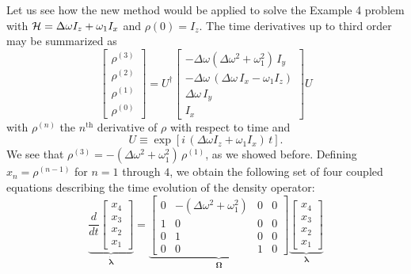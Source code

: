 Let us see how the new method would be applied to solve the Example 4 problem with ${\cal H} = \Delta \omega I_z + \omega_1 I_x$ and $\rho(0) = I_z$.  The time derivatives up to third order may be summarized as
\begin{equation}
\begin{bmatrix}
	\rho^{(3)} \\
	\rho^{(2)} \\
	\rho^{(1)} \\
	\rho^{(0)} 
\end{bmatrix}
=
U^{\dagger}
\begin{bmatrix}
	- \Delta\omega (\Delta\omega^2 + \omega_1^2) \, I_y \\
	-\Delta\omega \, (\Delta\omega \, I_x - \omega_1 I_z)  \\
	\Delta \omega \, I_y \\
	I_x 
\end{bmatrix}
U
\end{equation}
with $\rho^{(n)}$ the $n^{\text{th}}$ derivative of $\rho$ with respect to time and
\begin{equation}
U \equiv \exp{[i \, (\Delta \omega I_z + \omega_1 I_x) \, t]}.
\end{equation}
We see that $\rho^{(3)} = - (\Delta\omega^2 + \omega_1^2) \, \rho^{(1)}$, as we showed before.  Defining $x_n = \rho^{(n-1)}$ for $n = 1$ through $4$, we obtain the following set of four coupled equations describing the time evolution of the density operator:
\begin{equation}
\underbrace{
\frac{d}{dt} 
	\begin{bmatrix} 
		x_4 \\ x_3 \\ x_2 \\ x_1 
	\end{bmatrix}}_{\dot{\bm{\lambda}}}
	= \underbrace{\begin{bmatrix} 
	    0 & -(\Delta\omega^2 + \omega_1^2) & 0 & 0 \\
	    1 & 0 & 0 & 0 \\
		0 & 1 & 0 & 0 \\
		0 & 0 & 1 & 0
	  \end{bmatrix}}_{\bm{\Omega}}
	  \underbrace{\begin{bmatrix} 
	  	x_4 \\ x_3 \\ x_2 \\ x_1
	   \end{bmatrix}}_{\bm{\lambda}}
\end{equation}

